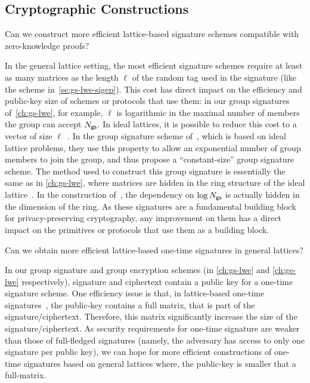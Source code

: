
\subsection*{Cryptographic Constructions}

\begin{question}
  Can we construct more efficient lattice-based signature schemes compatible with zero-knowledge proofs?
\end{question}

In the general lattice setting, the most efficient signature schemes require at least as many matrices as the length $\ell$ of the random tag used in the signature (like the scheme in~\cref{se:gs-lwe-sigep}).
This cost has direct impact on the efficiency and public-key size of schemes or protocols that use them: in our group signatures of~\cref{ch:gs-lwe}, for example, $\ell$ is logarithmic in the maximal number of members the group can accept ${N_\mathsf{gs}}$.
In ideal lattices, it is possible to reduce this cost to a vector of size $\ell$~\cite{DM14}.
In the group signature scheme of~\cite{LNWX18}, which is based on ideal lattice problems, they use this property to allow an exponential number of group members to join the group, and thus propose a ``constant-size'' group signature scheme.
The method used to construct this group signature is essentially the same as in \cref{ch:gs-lwe}, where matrices are hidden in the ring structure of the ideal lattice~\cite{LS14}.
In the construction of~\cite{LNWX18}, the dependency on $\log {N_\mathsf{gs}}$ is actually hidden in the dimension of the ring.
As these signatures are a fundamental building block for privacy-preserving cryptography, any improvement on them has a direct impact on the primitives or protocols that use them as a building block.

\begin{question}
  Can we obtain more efficient lattice-based one-time signatures in general lattices?
\end{question}

In our group signature and group encryption schemes (in \cref{ch:gs-lwe} and \cref{ch:ge-lwe} respectively), signature and ciphertext contain a public key for a one-time signature scheme.
One efficiency issue is that, in lattice-based one-time signatures~\cite{LM08,Moh11}, the public-key contains a full matrix, that is part of the signature/ciphertext.
Therefore, this matrix significantly increase the size of the signature/ciphertext.
As security requirements for one-time signature are weaker than those of full-fledged signatures (namely, the adversary has access to only one signature per public key), we can hope for more efficient constructions of one-time signatures based on general lattices where, the public-key is smaller that a full-matrix.

